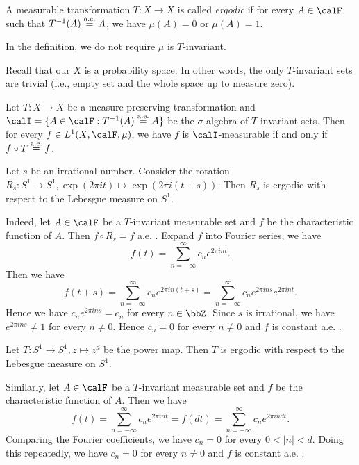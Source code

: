   \begin{definition}
    A measurable transformation $T: X \to X$ is called \emph{ergodic} if for every $A \in \calF$ such that $T^{-1}(A) \overset{\text{a.e.}}{=} A$, we have $\mu(A) = 0$ or $\mu(A) = 1$. 
  \end{definition}

  In the definition, we do not require $\mu$ is $T$-invariant.

  Recall that our $X$ is a probability space.
  In other words, the only $T$-invariant sets are trivial (i.e., empty set and the whole space up to measure zero).

  Let $T: X \to X$ be a measure-preserving transformation and $\calI = \{A \in \calF : T^{-1}(A) \aeeq A\}$ be the $\sigma$-algebra of $T$-invariant sets. 
  Then for every $f \in L^1(X, \calF, \mu)$, we have $f$ is $\calI$-measurable if and only if $f \circ T \overset{\text{a.e.}}{=} f$.

  \begin{example}
    Let $s$ be an irrational number. 
    Consider the rotation $R_s: S^1 \to S^1, \exp(2\pi i t) \mapsto \exp(2\pi i (t + s))$.
    Then $R_s$ is ergodic with respect to the Lebesgue measure on $S^1$.

    Indeed, let $A \in \calF$ be a $T$-invariant measurable set and $f$ be the characteristic function of $A$. 
    Then $f \circ R_s = f$ a.e. .
    Expand $f$ into Fourier series, we have 
    \[ f(t) = \sum_{n=-\infty}^\infty c_n e^{2\pi i n t}. \]
    Then we have
    \[ f(t+s) = \sum_{n=-\infty}^\infty c_n e^{2\pi i n (t+s)} = \sum_{n=-\infty}^\infty c_n e^{2\pi i n s} e^{2\pi i n t}. \]
    Hence we have $c_n e^{2\pi i n s} = c_n$ for every $n \in \bbZ$. 
    Since $s$ is irrational, we have $e^{2\pi i n s} \neq 1$ for every $n \neq 0$. 
    Hence $c_n = 0$ for every $n \neq 0$ and $f$ is constant a.e. .
  \end{example}

  \begin{example}
    Let $T: S^1 \to S^1, z \mapsto z^d$ be the power map. 
    Then $T$ is ergodic with respect to the Lebesgue measure on $S^1$.

    Similarly, let $A \in \calF$ be a $T$-invariant measurable set and $f$ be the characteristic function of $A$. 
    Then we have 
    \[ f(t) = \sum_{n=-\infty}^\infty c_n e^{2\pi i n t} = f(d t) = \sum_{n=-\infty}^\infty c_n e^{2\pi i n d t}. \]
    Comparing the Fourier coefficients, we have $c_n = 0$ for every $0 < |n| < d$.
    Doing this repeatedly, we have $c_n = 0$ for every $n \neq 0$ and $f$ is constant a.e. .
  \end{example}

